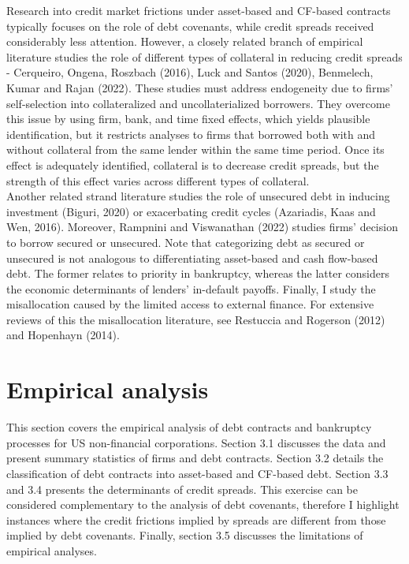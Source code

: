 \documentclass[12pt]{article}
\begin{document}
Research into credit market frictions under asset-based and CF-based contracts typically focuses on the role of debt covenants, while credit spreads received considerably less attention. However, a closely related branch of empirical literature studies the role of different types of collateral in reducing credit spreads -  Cerqueiro, Ongena, Roszbach (2016), Luck and Santos (2020), Benmelech, Kumar and Rajan (2022). These studies must address endogeneity due to firms' self-selection into collateralized and uncollaterialized borrowers. They overcome this issue by using firm, bank, and time fixed effects, which yields plausible identification, but it restricts analyses to firms that borrowed both with and without collateral from the same lender within the same time period. Once its effect is adequately identified, collateral is to decrease credit spreads, but the strength of this effect varies across different types of collateral. \vspace{3mm} \\
Another related strand literature studies the role of unsecured debt in inducing investment (Biguri, 2020) or exacerbating credit cycles (Azariadis, Kaas and Wen, 2016). Moreover, Rampnini and Viswanathan (2022) studies firms' decision to borrow secured or unsecured. Note that categorizing debt as secured or unsecured is not analogous to differentiating asset-based and cash flow-based debt. The former relates to priority in bankruptcy, whereas the latter considers the economic determinants of lenders' in-default payoffs. Finally, I study the misallocation caused by the limited access to external finance. For extensive reviews of this the misallocation literature, see Restuccia and Rogerson (2012) and Hopenhayn (2014).

\section{Empirical analysis \label{sec:empirical analysis}}

This section covers the empirical analysis of debt contracts and bankruptcy processes for US non-financial corporations. Section 3.1 discusses the data and present summary statistics of firms and debt contracts. Section 3.2 details the classification of debt contracts into asset-based and CF-based debt. Section 3.3 and 3.4 presents the determinants of credit spreads. This exercise can be considered complementary to the analysis of debt covenants, therefore I highlight instances where the credit frictions implied by spreads are different from those implied by debt covenants. Finally, section 3.5 discusses the limitations of empirical analyses. 
\end{document}
